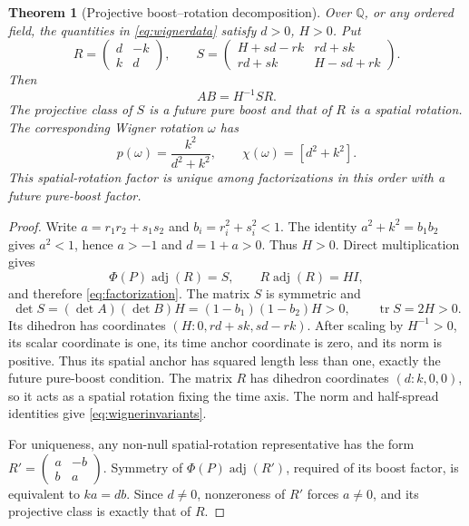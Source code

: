 \documentclass[11pt]{article}
\newcommand{\Q}{\mathbb Q}
\newcommand{\tr}{\operatorname{tr}}
\newcommand{\adj}{\operatorname{adj}}
\newtheorem{theorem}{Theorem}[section]
\theoremstyle{remark}
\begin{document}
\begin{theorem}[Projective boost--rotation decomposition]
Over \(\Q\), or any ordered field, the quantities in
\eqref{eq:wignerdata} satisfy \(d>0\), \(H>0\). Put
\[
 R=\begin{pmatrix}d&-k\\k&d\end{pmatrix},\qquad
 S=\begin{pmatrix}
 H+sd-rk&rd+sk\\rd+sk&H-sd+rk
 \end{pmatrix}.
\]
Then
\begin{equation}
 AB=H^{-1}SR.
 \label{eq:factorization}
\end{equation}
The projective class of \(S\) is a future pure boost and that of \(R\)
is a spatial rotation. The corresponding Wigner rotation \(\omega\) has
\begin{equation}
 p(\omega)=\frac{k^2}{d^2+k^2},\qquad
 \chi(\omega)=[d^2+k^2].
 \label{eq:wignerinvariants}
\end{equation}
This spatial-rotation factor is unique among factorizations in this order
with a future pure-boost factor.
\end{theorem}
\begin{proof}
Write \(a=r_1r_2+s_1s_2\) and \(b_i=r_i^2+s_i^2<1\).
The identity \(a^2+k^2=b_1b_2\) gives \(a^2<1\), hence \(a>-1\)
and \(d=1+a>0\). Thus \(H>0\). Direct multiplication gives
\[
 \Phi(P)\adj(R)=S,\qquad R\adj(R)=HI,
\]
and therefore \eqref{eq:factorization}. The matrix \(S\) is symmetric and
\[
 \det S=(\det A)(\det B)H=(1-b_1)(1-b_2)H>0,
 \qquad\tr S=2H>0.
\]
Its dihedron has coordinates
\( (H:0,rd+sk,sd-rk)\). After scaling by \(H^{-1}>0\), its scalar
coordinate is one, its time anchor coordinate is zero, and its norm is
positive. Thus its spatial anchor has squared length less than one, exactly
the future pure-boost condition. The matrix \(R\) has dihedron coordinates
\((d:k,0,0)\), so it acts as a spatial rotation fixing the time axis.
The norm and half-spread identities give \eqref{eq:wignerinvariants}.

For uniqueness, any non-null spatial-rotation representative has the form
\(R'=\left(\begin{smallmatrix}a&-b\\b&a\end{smallmatrix}\right)\).
Symmetry of \(\Phi(P)\adj(R')\), required of its boost factor, is
equivalent to \(ka=db\). Since \(d\ne0\), nonzeroness of \(R'\) forces
\(a\ne0\), and its projective class is exactly that of \(R\).
\end{proof}
\end{document}
